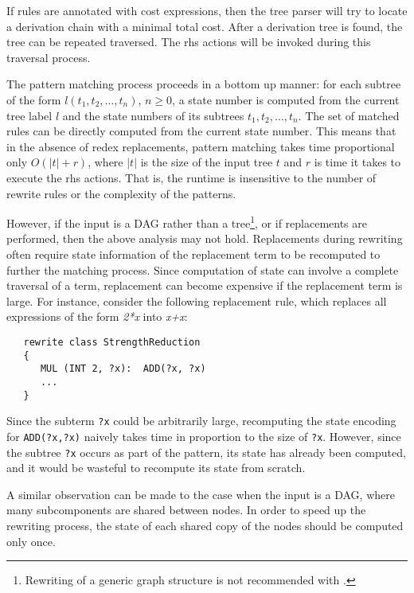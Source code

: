    If rules are annotated with cost expressions, then the
tree parser will try to locate a derivation chain with a minimal total
cost.  After a derivation tree is found, the tree can be repeated
traversed.  The rhs actions will be invoked during this traversal process.  

 \label{sec:state-caching}

   The pattern matching process proceeds in a bottom up manner: 
for each subtree of the form $l(t_1,t_2,\ldots,t_n)$, $n \ge 0$, 
a state number is computed from the current tree label $l$ and the
state numbers of its subtrees $t_1, t_2, \ldots, t_n$.  The set of matched
rules can be directly computed from the current state number.
This means that in the absence of redex replacements, pattern matching
takes time proportional only $O(|t| + r)$, where $|t|$ is the size 
of the input tree $t$ and $r$ is time it takes to execute the rhs actions.  
That is, the runtime is insensitive to the number of rewrite rules or the 
complexity of the patterns.

   However, if the input is a DAG rather than a tree\footnote{Rewriting
of a generic graph structure is not recommended with .},
or if replacements are performed, then the above analysis may not hold.
Replacements during rewriting often require state information of the
replacement term to be recomputed to further the matching process.  
Since computation of state can involve a complete traversal of a term, 
replacement can become expensive if the replacement term is large.  
For instance, consider the following replacement rule, which replaces 
all expressions of the form {\em 2*x} into {\em x+x}:
 
\begin{verbatim}
   rewrite class StrengthReduction
   {
      MUL (INT 2, ?x):  ADD(?x, ?x)
      ...
   }
\end{verbatim}
 
\noindent
Since the subterm \verb|?x| could be arbitrarily large, recomputing the
state encoding for \verb|ADD(?x,?x)| naively takes time in proportion to the
size of \verb|?x|.  However, since the subtree \verb|?x| occurs as part
of the pattern, its state has already been computed, and it would be
wasteful to recompute its state from scratch.  

A similar observation can be made to the case when the input is a DAG,
where many subcomponents are shared between nodes.  In order to speed
up the rewriting process, the state of each shared copy of the nodes 
should be computed only once.

